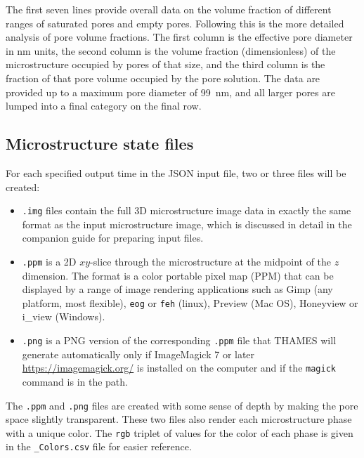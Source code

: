 \documentclass{article}
\begin{document}
\normalsize{ }
The first seven lines provide overall data on the volume fraction of different
ranges of saturated pores and empty pores. Following this is the more detailed
analysis of pore volume fractions. The first column is the effective
pore diameter in  \unit{\nano\meter} units, the second column is the
volume fraction (dimensionless) of the microstructure occupied by pores of that size,
and the third column is the fraction of that pore volume occupied by the
pore solution. The data are provided up to a maximum pore diameter of
\qty{99}{\nano\meter}, and all larger pores are lumped into a final category
on the final row.

\subsection{Microstructure state files}
For each specified output time in the JSON input file, two or three files
will be created:
\begin{itemize}
	\item \verb!.img! files contain the full 3D microstructure image data
	      in exactly the same format as the input microstructure image, which
	      is discussed in detail in the companion guide for preparing input
	      files.
	\item \verb!.ppm! is a 2D $xy$-slice through the microstructure at the
	      midpoint of the $z$ dimension. The format is a color portable pixel
	      map (PPM) that can be displayed by a range of image rendering applications
	      such as Gimp (any platform, most flexible), \verb!eog! or \verb!feh! (linux),
	      Preview (Mac OS), Honeyview or i\_view (Windows).
	\item \verb!.png! is a PNG version of the corresponding \verb!.ppm! file
	      that THAMES will generate automatically only if ImageMagick 7 or later
	      \url{https://imagemagick.org/} is
	      installed on the computer and if the \verb!magick! command is in the
	      path.
\end{itemize}

The \verb!.ppm! and \verb!.png! files are created with some sense of
depth by making the pore space slightly transparent. These two files
also render each microstructure phase with a unique color. The
\verb!rgb! triplet of values for the color of each phase is given
in the \verb!_Colors.csv! file for easier reference.
\end{document}
